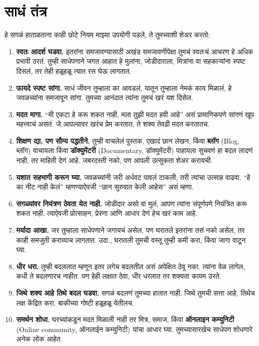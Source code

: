 \section*{साधं तंत्र}
हे सगळं हाताळताना काही छोटे नियम माझ्या उपयोगी पडले, ते तुमच्याशी शेअर करतो:
\begin{enumerate}

 \item \textbf{स्वतः आदर्श घडवा.} इतरांना समजावण्यासाठी अखंड समजावणीपेक्षा तुमचं स्वतःचं आचरण हे अधिक प्रभावी ठरतं. तुम्ही साधेपणाने जगत आहात हे मुलांना, जोडीदाराला, मित्रांना वा सहकाऱ्यांना स्पष्ट दिसलं,
 तर तेही हळूहळू त्यात रस घेऊ लागतात.
 \item  \textbf{फायदे स्पष्ट सांगा.} साधं जीवन तुम्हाला का आवडलं, यातून तुम्हाला नेमकं काय मिळालं,
 हे जवळच्यांना समजावून सांगा. तुमच्या आनंदात त्यांना तुमचं खरं यश दिसेल.
 \item  \textbf{मदत मागा.} “मी एकटा हे करू शकत नाही, मला तुझी मदत हवी आहे” असं प्रामाणिकपणे सांगणं खूप महत्त्वाचं असतं. जे आपल्यावर खरंच प्रेम करतात, ते शक्य तेवढी मदत करतातच.
 \item  \textbf{शिक्षण द्या, पण सौम्य पद्धतीने.} तुम्ही वाचलेलं पुस्तक, एखादं छान लेखन, किंवा \textbf{ब्लॉग} (Blog,  ब्लॉग) वाचायला किंवा \textbf{डॉक्युमेंटरी} (Documentary,  डॉक्युमेंटरी) पाहायला सुचवणं हा बदल लादणं नाही, तर माहिती देणं आहे. जबरदस्ती नको, पण आपली उत्सुकता शेअर करायची.
 \item   \textbf{यशात सहभागी करून घ्या.} जवळच्यांनी जरी अर्धवट पावलं टाकली, तरी त्यांचा उत्साह वाढवा.
 “हे का नीट नाही केलं” म्हणण्याऐवजी “छान सुरुवात केली आहेस” असं म्हणा.
 \item  \textbf{सगळ्यांवर नियंत्रण ठेवता येत नाही.} जोडीदार असो वा मुलं, आपण त्यांना संपूर्णपणे नियंत्रित करू शकत नाही. त्याऐवजी प्रोत्साहन, प्रेरणा आणि आधार देणं हेच खरं काम आहे.
 \item   \textbf{मर्यादा आखा.} जर तुम्हाला साधेपणाने जगायचं असेल, पण घरातले इतरांना तसं नको असेल,
 तर काही समजुती कराव्याच लागतात. उदा., घरातली तुमची वस्तू तुम्ही कमी करा, किंवा जागा वाटून घ्या.
 \item   \textbf{धीर धरा.} तुम्ही बदललात म्हणून इतर लगेच बदलतील असं अपेक्षित ठेवू नका. त्यांना वेळ लागेल, कधी ते बदलणारच नाहीत. पण हेही लक्षात ठेवा,  धीर धरलात तर शक्यता कायम उरते.
 \item  \textbf{जिथे शक्य आहे तिथे बदल घडवा.} सगळं बदलणं तुमच्या हातात नाही. जिथे तुमची सत्ता आहे,
 तिथेच लक्ष केंद्रित करा. बाकीच्या गोष्टी हळूहळू येतीलच.
 \item   \textbf{समर्थन शोधा.} घरच्यांकडून मदत मिळाली नाही तर मित्र, समाज, किंवा \textbf{ऑनलाइन कम्युनिटी} (Online community,  ऑनलाईन कम्युनिटी) यांचा आधार घ्या. तुमच्यासारखेच साधेपण शोधणारे अनेक लोक आहेत.
\end{enumerate}
